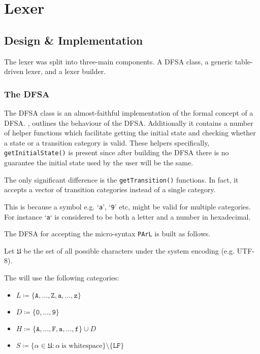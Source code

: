 \section{Lexer}

\subsection{Design \& Implementation}

The lexer was split into three-main components. A
DFSA class, a generic table-driven lexer, and a
lexer builder.

\subsubsection{The DFSA}

The DFSA class is an almost-faithful
implementation of the formal concept of a DFSA.
, outlines the behaviour of the
DFSA. Additionally it contains a number of helper
functions which facilitate getting the initial
state and checking whether a state or a transition
category is valid. These helpers specifically,
\texttt{getInitialState()} is present since after
building the DFSA there is no guarantee the
initial state used by the user will be the same.



The only significant difference is the
\texttt{getTransition()} functions. In fact, it
accepts a vector of transition categories instead
of a single category.

This is because a symbol e.g. `\texttt{a}',
`\texttt{9}' etc, might be valid for multiple
categories. For instance `\texttt{a}` is
considered to be both a letter and a number in
hexadecimal.

The DFSA for accepting the micro-syntax
\texttt{PArL} is built as follows.

Let $\mathfrak{U}$ be the set of all possible
characters under the system encoding (e.g. UTF-8).

The will use the following categories:

\begin{itemize}
    \item $L \coloneq \{
        \texttt{A},\ldots,\texttt{Z},\texttt{a},\ldots,\texttt{z}\}$
    \item $D \coloneq
        \{\texttt{0},\ldots,\texttt{9}\}$
    \item $H \coloneq
        \{\texttt{A},\ldots,\texttt{F},\texttt{a},\ldots,\texttt{f}\}
        \cup D$
    \item $S \coloneq \{\alpha \in \mathfrak{U}
        \colon \alpha\ \text{is
    whitespace}\}\setminus\{\texttt{LF}\}$
\end{itemize}

